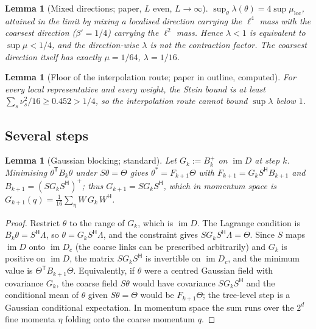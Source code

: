 \documentclass[11pt,a4paper]{article}
\newtheorem{lemma}[theorem]{Lemma}
\theoremstyle{definition}
\theoremstyle{remark}
\newcommand{\im}{\operatorname{im}}
\begin{document}
\begin{lemma}[Mixed directions; paper, $L$ even, $L\to\infty$]\label{lem:mixed}
$\sup_\theta\lambda(\theta)=4\sup\mu_{\mathrm{loc}}$, attained in the limit by mixing a localised direction carrying the $\ell^4$ mass with the coarsest direction ($\beta'=1/4$) carrying the $\ell^2$ mass. Hence $\lambda<1$ is equivalent to $\sup\mu<1/4$, and the direction-wise $\lambda$ is not the contraction factor. The coarsest direction itself has exactly $\mu=1/64$, $\lambda=1/16$.
\end{lemma}

\begin{lemma}[Floor of the interpolation route; paper in outline, computed]\label{lem:floor}
For every local representative and every weight, the Stein bound is at least $\sum_s\nu_s^2/16\ge0.452>1/4$, so the interpolation route cannot bound $\sup\lambda$ below $1$.
\end{lemma}

\subsection{Several steps}

\begin{lemma}[Gaussian blocking; standard]\label{lem:A}
Let $G_k:=B_k^{+}$ on $\im D$ at step $k$. Minimising $\theta^{\mathsf T}B_k\theta$ under $S\theta=\Theta$ gives $\theta^*=F_{k+1}\Theta$ with $F_{k+1}=G_kS^{\mathsf H}B_{k+1}$ and $B_{k+1}=(SG_kS^{\mathsf H})^{+}$; thus $G_{k+1}=SG_kS^{\mathsf H}$, which in momentum space is $G_{k+1}(q)=\frac1{16}\sum_\eta W\,G_k\,W^{\mathsf H}$.
\end{lemma}

\begin{proof}
Restrict $\theta$ to the range of $G_k$, which is $\im D$. The Lagrange condition is $B_k\theta=S^{\mathsf H}\Lambda$, so $\theta=G_kS^{\mathsf H}\Lambda$, and the constraint gives $SG_kS^{\mathsf H}\Lambda=\Theta$. Since $S$ maps $\im D$ onto $\im D_c$ (the coarse links can be prescribed arbitrarily) and $G_k$ is positive on $\im D$, the matrix $SG_kS^{\mathsf H}$ is invertible on $\im D_c$, and the minimum value is $\Theta^{\mathsf T}B_{k+1}\Theta$. Equivalently, if $\theta$ were a centred Gaussian field with covariance $G_k$, the coarse field $S\theta$ would have covariance $SG_kS^{\mathsf H}$ and the conditional mean of $\theta$ given $S\theta=\Theta$ would be $F_{k+1}\Theta$; the tree-level step is a Gaussian conditional expectation. In momentum space the sum runs over the $2^d$ fine momenta $\eta$ folding onto the coarse momentum $q$.
\end{proof}
\end{document}
